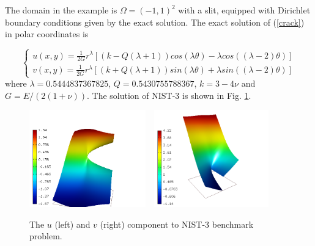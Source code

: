 \documentclass[12pt]{elsarticle}
\begin{document}
The domain in the example is $\Omega = (-1, 1)^2$ with a slit,
equipped with Dirichlet boundary conditions given by the
exact solution. The exact solution of (\ref{crack}) in polar coordinates is

\[
\left\{
\begin{array}{l}
\displaystyle
u(x, y) = \frac{1}{2G} r^{\lambda}[(k - Q(\lambda + 1))cos(\lambda \theta) - \lambda cos((\lambda - 2) \theta)]  \\
\displaystyle
v(x, y) = \frac{1}{2G} r^{\lambda}[(k + Q(\lambda + 1))sin(\lambda \theta) + \lambda sin((\lambda - 2) \theta)]
\end{array}
\right.
\]
where $\lambda = 0.5444837367825$, $Q = 0.5430755788367$,
$k = 3 - 4 \nu$ and $G = E / (2(1 + \nu))$.
The solution of NIST-3 is shown in Fig. \ref{fig:sln-nist03}.

\begin{figure}[H]
\centering
\vspace{-5mm}
\includegraphics[height=4.2cm]{nist/nist-3/solution-u.png}\ \
\includegraphics[height=4.2cm]{nist/nist-3/solution-v.png}
\vspace{-2mm}
\caption{The $u$ (left) and $v$ (right) component to NIST-3 benchmark problem.}
\vspace{-3mm}
\label{fig:sln-nist03}
\end{figure}
\end{document}
